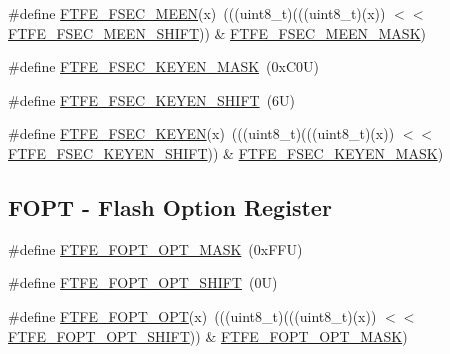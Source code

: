 \begin{DoxyCompactItemize}
\item 
\#define \mbox{\hyperlink{group___f_t_f_e___register___masks_ga108bfb67146722401793624ac45080fe}{F\+T\+F\+E\+\_\+\+F\+S\+E\+C\+\_\+\+M\+E\+EN}}(x)~(((uint8\+\_\+t)(((uint8\+\_\+t)(x)) $<$$<$ \mbox{\hyperlink{group___f_t_f_e___register___masks_gabcb6c110f2c3a61788237eb32991610d}{F\+T\+F\+E\+\_\+\+F\+S\+E\+C\+\_\+\+M\+E\+E\+N\+\_\+\+S\+H\+I\+FT}})) \& \mbox{\hyperlink{group___f_t_f_e___register___masks_ga1eb5ff8901b0e60cc847e11e66096931}{F\+T\+F\+E\+\_\+\+F\+S\+E\+C\+\_\+\+M\+E\+E\+N\+\_\+\+M\+A\+SK}})
\item 
\#define \mbox{\hyperlink{group___f_t_f_e___register___masks_ga7417ca1039c57d3a275bef88e0cfe6f1}{F\+T\+F\+E\+\_\+\+F\+S\+E\+C\+\_\+\+K\+E\+Y\+E\+N\+\_\+\+M\+A\+SK}}~(0x\+C0\+U)
\item 
\#define \mbox{\hyperlink{group___f_t_f_e___register___masks_gacd8d966f0f526c11eec0590854c258be}{F\+T\+F\+E\+\_\+\+F\+S\+E\+C\+\_\+\+K\+E\+Y\+E\+N\+\_\+\+S\+H\+I\+FT}}~(6\+U)
\item 
\#define \mbox{\hyperlink{group___f_t_f_e___register___masks_gaf3cfda2df1d49468dfe24d96469b07a3}{F\+T\+F\+E\+\_\+\+F\+S\+E\+C\+\_\+\+K\+E\+Y\+EN}}(x)~(((uint8\+\_\+t)(((uint8\+\_\+t)(x)) $<$$<$ \mbox{\hyperlink{group___f_t_f_e___register___masks_gacd8d966f0f526c11eec0590854c258be}{F\+T\+F\+E\+\_\+\+F\+S\+E\+C\+\_\+\+K\+E\+Y\+E\+N\+\_\+\+S\+H\+I\+FT}})) \& \mbox{\hyperlink{group___f_t_f_e___register___masks_ga7417ca1039c57d3a275bef88e0cfe6f1}{F\+T\+F\+E\+\_\+\+F\+S\+E\+C\+\_\+\+K\+E\+Y\+E\+N\+\_\+\+M\+A\+SK}})
\end{DoxyCompactItemize}
\subsection*{F\+O\+PT -\/ Flash Option Register}
\begin{DoxyCompactItemize}
\item 
\#define \mbox{\hyperlink{group___f_t_f_e___register___masks_gafbeb43ee4b3c54b91d39f7ac619c129f}{F\+T\+F\+E\+\_\+\+F\+O\+P\+T\+\_\+\+O\+P\+T\+\_\+\+M\+A\+SK}}~(0x\+F\+F\+U)
\item 
\#define \mbox{\hyperlink{group___f_t_f_e___register___masks_gaa36bd1377899a70f05455ce2b627f775}{F\+T\+F\+E\+\_\+\+F\+O\+P\+T\+\_\+\+O\+P\+T\+\_\+\+S\+H\+I\+FT}}~(0\+U)
\item 
\#define \mbox{\hyperlink{group___f_t_f_e___register___masks_ga342e8cc09bf4a65b74d1db1f1cf85273}{F\+T\+F\+E\+\_\+\+F\+O\+P\+T\+\_\+\+O\+PT}}(x)~(((uint8\+\_\+t)(((uint8\+\_\+t)(x)) $<$$<$ \mbox{\hyperlink{group___f_t_f_e___register___masks_gaa36bd1377899a70f05455ce2b627f775}{F\+T\+F\+E\+\_\+\+F\+O\+P\+T\+\_\+\+O\+P\+T\+\_\+\+S\+H\+I\+FT}})) \& \mbox{\hyperlink{group___f_t_f_e___register___masks_gafbeb43ee4b3c54b91d39f7ac619c129f}{F\+T\+F\+E\+\_\+\+F\+O\+P\+T\+\_\+\+O\+P\+T\+\_\+\+M\+A\+SK}})
\end{DoxyCompactItemize}
